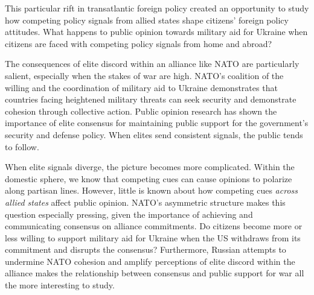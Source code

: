 This particular rift in transatlantic foreign policy created an opportunity to study how competing policy signals from allied states shape citizens' foreign policy attitudes. What happens to public opinion towards military aid for Ukraine when citizens are faced with competing policy signals from home and abroad? 

The consequences of elite discord within an alliance like NATO are particularly salient, especially when the stakes of war are high. NATO's coalition of the willing and the coordination of military aid to Ukraine demonstrates that countries facing heightened military threats can seek security and demonstrate cohesion through collective action. Public opinion research has shown the importance of elite consensus for maintaining public support for the government's security and defense policy. \autocite{berinsky_assuming_2007, groeling_crossing_2008, baum_relationships_2008, baum_shot_2009} When elites send consistent signals, the public tends to follow.\autocite{mueller_war_1973} 

When elite signals diverge, the picture becomes more complicated. Within the domestic sphere, we know that competing cues can cause opinions to polarize along partisan lines. \autocite{berinsky_assuming_2007, druckman_how_2013} However, little is known about how competing cues \emph{across allied states} affect public opinion. NATO's asymmetric structure makes this question especially pressing, given the importance of achieving and communicating consensus on alliance commitments. Do citizens become more or less willing to support military aid for Ukraine when the US withdraws from its commitment and disrupts the consensus? Furthermore, Russian attempts to undermine NATO cohesion and amplify perceptions of elite discord within the alliance makes the relationship between consensus and public support for war all the more interesting to study. 



